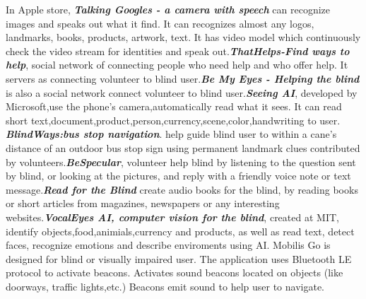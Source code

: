 \documentclass[11pt]{ucscthesis}
\begin{document}
In Apple store,  \textbf{\textit{Talking Googles - a camera with speech}} can recognize images and speaks out what it find. It can recognizes almost any logos, landmarks, books, products, artwork, text. It has video model which continuously check the video stream for identities and speak out.\textbf{\textit{ThatHelps-Find ways to help}}, social network of connecting people who need help and who offer help. It servers as connecting volunteer to blind user.\textbf{\textit{Be My Eyes - Helping the blind}} is also a social network connect volunteer to blind user.\textbf{\textit{Seeing AI}}, developed by Microsoft,use the phone's camera,automatically read what it sees. It can read short text,document,product,person,currency,scene,color,handwriting to user. \textbf{\textit{BlindWays:bus stop navigation}}. help guide blind user to within a cane's distance of an outdoor bus stop sign using permanent landmark clues contributed by volunteers.\textbf{\textit{BeSpecular}}, volunteer help blind by listening to the question sent by blind, or looking at the pictures, and reply with a friendly voice note or text message.\textbf{\textit{Read for the Blind}} create audio books for the blind, by reading books or short articles from magazines, newspapers or any interesting websites.\textbf{\textit{VocalEyes AI, computer vision for the blind}}, created at MIT, identify objects,food,animials,currency and products, as well as read text, detect faces, recognize emotions and describe enviroments using AI. 
 Mobilis Go is designed for blind or visually impaired user. The application uses Bluetooth LE protocol to activate beacons. Activates sound beacons located on objects (like doorways, traffic lights,etc.) Beacons emit sound to help user to navigate.
\end{document}
